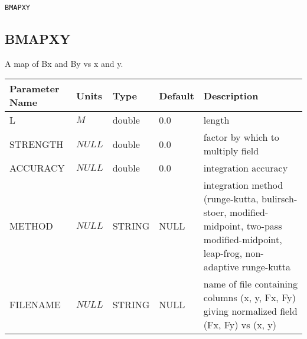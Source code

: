 \begin{latexonly}
\newpage
\begin{center}{\Large\verb|BMAPXY|}\end{center}
\end{latexonly}\subsection{BMAPXY}
A map of Bx and By vs x and y.
\\
\begin{tabular}{|l|l|l|l|p{\descwidth}|} \hline
Parameter Name & Units & Type & Default & Description \\ \hline 
L & $M$ & double &  0.0 & length  \\ \hline 
STRENGTH & $NULL$ & double &  0.0 & factor by which to multiply field  \\ \hline 
ACCURACY & $NULL$ & double &  0.0 & integration accuracy  \\ \hline 
METHOD & $NULL$ & STRING &   NULL            & integration method (runge-kutta, bulirsch-stoer, modified-midpoint, two-pass modified-midpoint, leap-frog, non-adaptive runge-kutta  \\ \hline 
FILENAME & $NULL$ & STRING &   NULL            & name of file containing columns (x, y, Fx, Fy) giving normalized field (Fx, Fy) vs (x, y)  \\ \hline 
\end{tabular}

